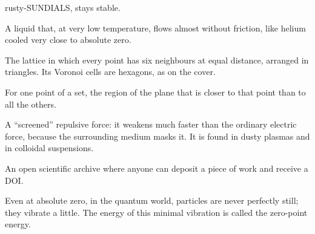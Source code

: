 \begin{description}[style=nextline,leftmargin=0pt,font=\normalfont\sffamily\bfseries\color{okbleu},itemsep=5pt]
rusty-SUNDIALS, stays stable.
\item[Superfluid] A liquid that, at very low temperature, flows almost without friction, like helium cooled very
close to absolute zero.
\item[Triangular lattice] The lattice in which every point has six neighbours at equal distance, arranged in triangles.
Its Voronoi cells are hexagons, as on the cover.
\item[Voronoi (cell)] For one point of a set, the region of the plane that is closer to that point than to all the
others.
\item[Yukawa (force)] A ``screened'' repulsive force: it weakens much faster than the ordinary electric force, because
the surrounding medium masks it. It is found in dusty plasmas and in colloidal suspensions.
\item[Zenodo] An open scientific archive where anyone can deposit a piece of work and receive a DOI.
\item[Zero-point energy] Even at absolute zero, in the quantum world, particles are never perfectly still; they vibrate a
little. The energy of this minimal vibration is called the zero-point energy.
\end{description}
